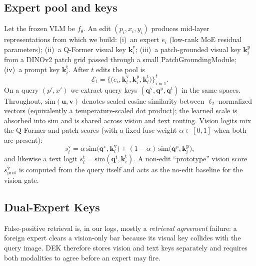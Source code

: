 \documentclass[letterpaper]{article} %
\begin{document}
\subsection{Expert pool and keys}
Let the frozen VLM be $f_\theta$.
An edit $(p_i,x_i,y_i)$ produces mid-layer representations from which we build:
(i)~an expert $e_i$ (low-rank MoE residual parameters);
(ii)~a Q-Former visual key $\mathbf{k}^{\mathrm{v}}_i$;
(iii)~a patch-grounded visual key $\mathbf{k}^{\mathrm{p}}_i$ from a DINOv2 patch grid passed through a small PatchGroundingModule;
(iv)~a prompt key $\mathbf{k}^{\mathrm{t}}_i$.
After $t$ edits the pool is
\begin{equation}
\mathcal{E}_t=\bigl\{\bigl(e_i,\mathbf{k}^{\mathrm{v}}_i,\mathbf{k}^{\mathrm{p}}_i,\mathbf{k}^{\mathrm{t}}_i\bigr)\bigr\}_{i=1}^{t}.
\label{eq:pool}
\end{equation}
On a query $(p',x')$ we extract query keys $(\mathbf{q}^{\mathrm{v}},\mathbf{q}^{\mathrm{p}},\mathbf{q}^{\mathrm{t}})$ in the same spaces.
Throughout, $\mathrm{sim}(\mathbf{u},\mathbf{v})$ denotes scaled cosine similarity between $\ell_2$-normalized vectors (equivalently a temperature-scaled dot product); the learned scale is absorbed into $\mathrm{sim}$ and is shared across vision and text routing.
Vision logits mix the Q-Former and patch scores (with a fixed fuse weight $\alpha\!\in\![0,1]$ when both are present):
\begin{equation}
s^{\mathrm{v}}_i
=
\alpha\,\mathrm{sim}\!\bigl(\mathbf{q}^{\mathrm{v}},\mathbf{k}^{\mathrm{v}}_i\bigr)
+
(1-\alpha)\,\mathrm{sim}\!\bigl(\mathbf{q}^{\mathrm{p}},\mathbf{k}^{\mathrm{p}}_i\bigr),
\label{eq:vis-logit}
\end{equation}
and likewise a text logit $s^{\mathrm{t}}_i=\mathrm{sim}(\mathbf{q}^{\mathrm{t}},\mathbf{k}^{\mathrm{t}}_i)$.
A non-edit ``prototype'' vision score $s^{\mathrm{v}}_{\mathrm{prot}}$ is computed from the query itself and acts as the no-edit baseline for the vision gate.


\subsection{Dual-Expert Keys}
False-positive retrieval is, in our logs, mostly a \emph{retrieval agreement} failure: a foreign expert clears a vision-only bar because its visual key collides with the query image.
DEK therefore stores vision and text keys separately and requires both modalities to agree before an expert may fire. 

\end{document}
